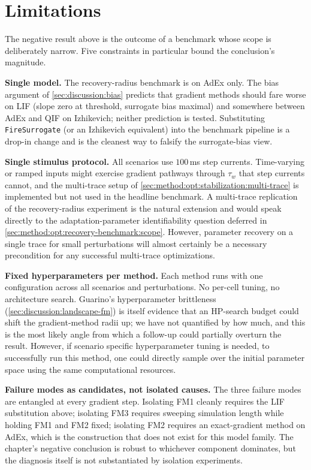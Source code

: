 \section{Limitations}\label{sec:discussion:limitations}
The negative result above is the outcome of a benchmark whose scope is deliberately narrow.
Five constraints in particular bound the conclusion's magnitude.

\textbf{Single model.}
The recovery-radius benchmark is on \gls{AdEx} only.
The bias argument of \cref{sec:discussion:bias} predicts that gradient methods should fare worse on \gls{LIF} (slope zero at threshold, surrogate bias maximal) and somewhere between \gls{AdEx} and \gls{QIF} on Izhikevich; neither prediction is tested.
Substituting \texttt{FireSurrogate} (or an Izhikevich equivalent) into the benchmark pipeline is a drop-in change and is the cleanest way to falsify the surrogate-bias view.

\textbf{Single stimulus protocol.}
All scenarios use $100$\,ms step currents.
Time-varying or ramped inputs might exercise gradient pathways through $\tau_w$ that step currents cannot, and the multi-trace setup of \cref{sec:method:opt:stabilization:multi-trace} is implemented but not used in the headline benchmark.
A multi-trace replication of the recovery-radius experiment is the natural extension and would speak directly to the adaptation-parameter identifiability question deferred in \cref{sec:method:opt:recovery-benchmark:scope}.
However, parameter recovery on a single trace for small perturbations will almost certainly be a necessary precondition for any successful multi-trace optimizations.

\textbf{Fixed hyperparameters per method.}
Each method runs with one configuration across all scenarios and perturbations.
No per-cell tuning, no architecture search.
Guarino's hyperparameter brittleness (\cref{sec:discussion:landscape-fm}) is itself evidence that an \gls{HP}-search budget could shift the gradient-method radii up;
we have not quantified by how much, and this is the most likely angle from which a follow-up could partially overturn the result.
However, if scenario specific hyperparameter tuning is needed, to successfully run this method, one could directly sample over the initial parameter space using the same computational resources.

\textbf{Failure modes as candidates, not isolated causes.}
The three failure modes are entangled at every gradient step.
Isolating FM1 cleanly requires the LIF substitution above;
isolating FM3 requires sweeping simulation length while holding FM1 and FM2 fixed;
isolating FM2 requires an exact-gradient method on \gls{AdEx}, which is the construction that does not exist for this model family.
The chapter's negative conclusion is robust to whichever component dominates, but the diagnosis itself is not substantiated by isolation experiments.

